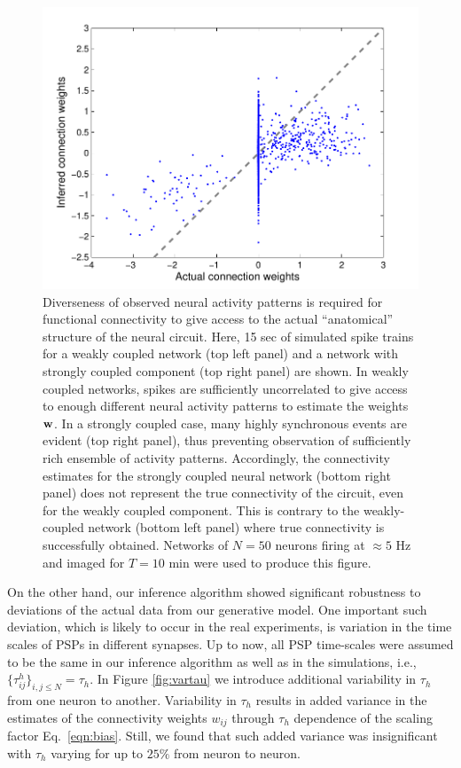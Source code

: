 \documentclass[aoas,preprint]{imsart}
\begin{document}
\begin{figure}[h]
\begin{minipage}[c]{0.45\hsize}
\end{minipage}
\begin{minipage}[c]{0.45\hsize}
\includegraphics[width=\hsize]{../figs/FigureA8_strong_corr}
\end{minipage}
\caption{
Diverseness of observed neural activity patterns is required for functional connectivity to give access to the actual ``anatomical'' structure of the neural circuit. Here, 15 sec of simulated spike trains for a weakly coupled network (top left panel) and a network with strongly coupled component (top right panel) are shown. In weakly coupled networks, spikes are sufficiently uncorrelated to give access to enough different neural activity patterns to estimate the weights ${\bf w}$. In a strongly coupled case, many highly synchronous events are evident (top right panel), thus preventing observation of sufficiently rich ensemble of activity patterns. Accordingly, the connectivity estimates for the strongly coupled neural network (bottom right panel) does not represent the true connectivity of the circuit, even for the weakly coupled component. This is contrary to the weakly-coupled network (bottom left panel) where true connectivity is successfully obtained. Networks of $N=50$ neurons firing at $\approx 5$ Hz and imaged for $T=10$ min were used to produce this figure.}
\label{fig:rasters}
\end{figure}

On the other hand, our inference algorithm showed significant robustness to deviations of the actual data from our generative model. One important such deviation, which is likely to occur in the real experiments, is variation in the time scales of PSPs in different synapses. Up to now, all PSP time-scales were assumed to be the same in our inference algorithm as well as in the simulations, i.e., $\{\tau^h_{ij}\}_{i,j\leq N}=\tau_h$. In Figure \ref{fig:vartau} we introduce additional variability in $\tau_h$ from one neuron to another. Variability in $\tau_h$ results in added variance in the estimates of the connectivity weights $w_{ij}$ through $\tau_h$ dependence of the scaling factor Eq.~\eqref{eqn:bias}. Still, we found that such added variance was insignificant with $\tau_h$ varying for up to $25\%$ from neuron to neuron.
\end{document}
